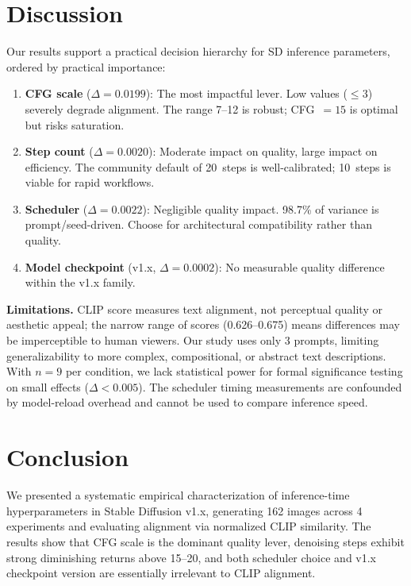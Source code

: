 \documentclass{article}
\begin{document}
\section{Discussion}

Our results support a practical decision hierarchy for SD inference parameters,
ordered by practical importance:

\begin{enumerate}
\item \textbf{CFG scale} ($\Delta = 0.0199$): The most impactful lever.
  Low values ($\leq 3$) severely degrade alignment.
  The range 7--12 is robust; CFG~$= 15$ is optimal but risks saturation.
\item \textbf{Step count} ($\Delta = 0.0020$): Moderate impact on quality,
  large impact on efficiency.
  The community default of 20~steps is well-calibrated;
  10~steps is viable for rapid workflows.
\item \textbf{Scheduler} ($\Delta = 0.0022$): Negligible quality impact.
  98.7\% of variance is prompt/seed-driven.
  Choose for architectural compatibility rather than quality.
\item \textbf{Model checkpoint} (v1.x, $\Delta = 0.0002$): No measurable
  quality difference within the v1.x family.
\end{enumerate}

\noindent\textbf{Limitations.}
CLIP score measures text alignment, not perceptual quality or aesthetic appeal;
the narrow range of scores (0.626--0.675) means differences may be imperceptible
to human viewers.
Our study uses only 3 prompts, limiting generalizability to more complex,
compositional, or abstract text descriptions.
With $n = 9$ per condition, we lack statistical power for formal significance
testing on small effects ($\Delta < 0.005$).
The scheduler timing measurements are confounded by model-reload overhead
and cannot be used to compare inference speed.

\section{Conclusion}

We presented a systematic empirical characterization of inference-time
hyperparameters in Stable Diffusion v1.x, generating 162 images across 4
experiments and evaluating alignment via normalized CLIP similarity.
The results show that CFG scale is the dominant quality lever, denoising steps
exhibit strong diminishing returns above 15--20, and both scheduler choice and
v1.x checkpoint version are essentially irrelevant to CLIP alignment.
\end{document}
